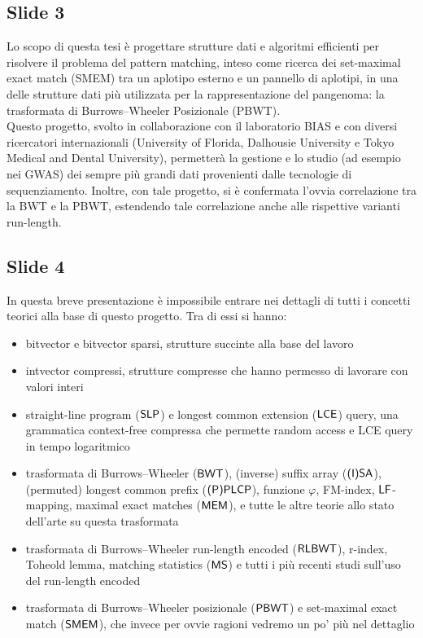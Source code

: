 \documentclass[a4paper,11pt, oneside,italian]{article}
\def\SLP{\mbox{\rm {\sf SLP}}}
\def\LCE{\mbox{\rm {\sf LCE}}}
\def\LF{\mbox{\rm {\sf LF}}}
\def\IISA{\mbox{\rm {\sf (I)SA}}}
\def\PPLCP{\mbox{\rm {\sf (P)PLCP}}}
\def\RLBWT{\mbox{\rm {\sf RLBWT}}}
\def\MEM{\mbox{\rm {\sf MEM}}}
\def\MS{\mbox{\rm {\sf MS}}}
\def\BWT{\mbox{\rm {\sf BWT}}}
\def\PBWT{\mbox{\rm {\sf PBWT}}}
\def\SMEM{\mbox{\rm {\sf SMEM}}}
\def\LCE{\mbox{\rm {\sf LCE}}}
\begin{document}
\subsection*{Slide 3}
Lo scopo di questa tesi è progettare strutture dati e algoritmi eﬀicienti per
risolvere il problema del pattern matching, inteso come ricerca dei set-maximal
exact match (SMEM) tra un aplotipo esterno e un pannello di aplotipi, in una
delle strutture dati più utilizzata per la rappresentazione del pangenoma: la
trasformata di Burrows–Wheeler Posizionale (PBWT).\\
Questo progetto, svolto in collaborazione con il laboratorio BIAS e
con diversi ricercatori internazionali (University of Florida, Dalhousie
University e Tokyo Medical and Dental University), permetterà la gestione e lo
studio (ad esempio nei GWAS) dei
sempre più grandi dati provenienti dalle tecnologie di sequenziamento. Inoltre,
con tale progetto, si è confermata l'ovvia correlazione tra la BWT e la PBWT,
estendendo tale correlazione anche alle rispettive varianti run-length.
\subsection*{Slide 4}
In questa breve presentazione è impossibile entrare nei dettagli di tutti i
concetti teorici alla base di questo progetto. Tra di essi si hanno:
\begin{itemize}
  \item bitvector e bitvector sparsi, strutture succinte alla base del lavoro
  \item intvector compressi, strutture compresse che hanno permesso di lavorare
  con valori interi
  \item straight-line program ($\SLP$) e longest common extension ($\LCE$)
  query, una grammatica context-free compressa che permette random access e LCE
  query in tempo logaritmico
  \item trasformata di Burrows--Wheeler ($\BWT$), (inverse) suffix array
  ($\IISA$), (permuted) longest common prefix ($\PPLCP$), funzione $\varphi$,
  FM-index, 
  $\LF$-mapping, maximal exact matches ($\MEM$), e tutte le altre teorie allo
  stato dell'arte su questa trasformata
  \item trasformata di Burrows--Wheeler run-length encoded ($\RLBWT$),
  r-index, Toheold lemma, matching statistics ($\MS$) e tutti i più recenti
  studi sull'uso del 
  run-length encoded
  \item trasformata di Burrows--Wheeler posizionale ($\PBWT$) e set-maximal
  exact match ($\SMEM$), che invece per ovvie ragioni vedremo un po' più nel
  dettaglio
\end{itemize}
\end{document}
